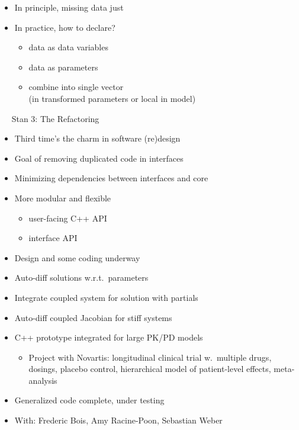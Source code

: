 \documentclass[10pt]{report}
\newcommand{\sld}[1]{\newpage{\noindent\LARGE \ \ \
    \textcolor{MidnightBlue}{\bfseries #1}}\vspace*{4pt}}
\newcommand{\spc}{\hspace*{0.25in}}
\newcommand{\myemph}[1]{{\color{MidnightBlue}{\bfseries #1}}}
\newcommand{\mypart}[2]{{\newpage 
\mbox{ }
\vfill
\noindent\spc\color{MidnightBlue}{\LARGE\bfseries #1\\[10pt]\spc\Huge{#2}}
\vfill\vfill}
\mbox{ }}
\begin{document}
\sld{Models with Missing Data}
\begin{itemize}
\item In principle, missing data just \myemph{additional parameters}
\item In practice, how to declare? 
\begin{itemize}
\item \myemph{observed} data as data variables
\item \myemph{missing} data as parameters
\item combine into single vector 
\\ {\footnotesize (in transformed parameters or local in model)}
\end{itemize}
\end{itemize}

\mypart{{\LARGE The Future:} \\ \spc\spc{\Huge Stan 3 \& Beyond}}

\sld{Stan 3: The Refactoring}
\begin{itemize}
\item Third time's the charm in software (re)design
\item Goal of removing duplicated code in interfaces
\item Minimizing dependencies between interfaces and core
\item More modular and flexible
\vspace*{-4pt}
\begin{itemize}\small
\item user-facing C++ API
\item interface API
\end{itemize}
\vfill
\item Design and some coding underway
\end{itemize}


\sld{Differential Equation Solver}
\begin{itemize}
\item Auto-diff solutions w.r.t.\ parameters
\item Integrate coupled system for solution with partials
\item Auto-diff coupled Jacobian for stiff systems
\vfill
\item C++ prototype integrated for large PK/PD models
\vspace*{-4pt}
\begin{itemize}\footnotesize
\item 
Project with Novartis: 
  longitudinal clinical trial w.\ multiple drugs, dosings, placebo control,
  hierarchical model of patient-level effects, meta-analysis
\end{itemize}
\vfill
\item Generalized code complete, under testing
\item {\footnotesize With: Frederic Bois, Amy Racine-Poon, Sebastian Weber}
\end{itemize}
\end{document}
